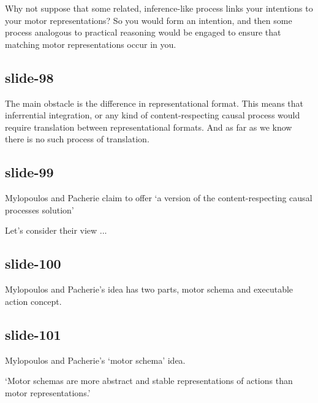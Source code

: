 \documentclass[12pt,\papersize]{extarticle}
\begin{document}
Why not suppose that some related, inference-like process links your intentions
to your motor representations?
So you would form an intention, and then some process analogous to practical reasoning
would be engaged to ensure that matching motor representations occur in you.

\subsection{slide-98}
The main obstacle is the difference in representational format.
This means that inferrential integration, or any kind of content-respecting
causal process would require translation between representational formats.
And as far as we know there is no such process of translation.

\subsection{slide-99}
Mylopoulos and Pacherie claim to offer
‘a version of the content-respecting causal
processes solution’

Let’s consider their view ...

\subsection{slide-100}
Mylopoulos and Pacherie’s idea has two parts, motor schema and executable action concept.

\subsection{slide-101}
Mylopoulos and Pacherie’s ‘motor schema’ idea.

‘Motor schemas are more abstract and stable representations of actions than motor
representations.’
\end{document}
